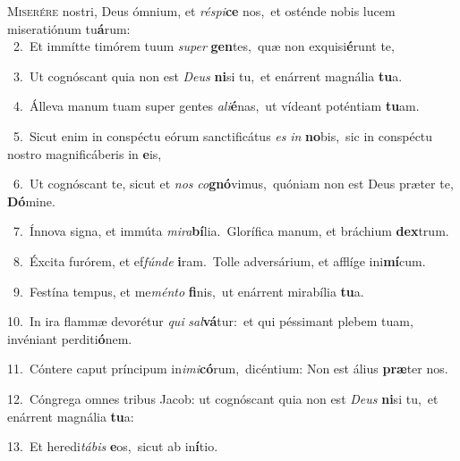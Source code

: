 \lettrine{\initial\textcolor{\initialcolor}{M}}{iserére} nostri, Deus ómnium, et \textit{ré}\-\textit{spi}\textbf{ce} nos,~\star et osténde nobis lucem miseratiónum tu\-\textbf{á}\-rum:\\
{\numbfont\textcolor{\numbcolor}{~2.}}~Et immítte timórem tuum \textit{su}\-\textit{per} \textbf{gen}\-tes,~\star quæ non exquisi\-\textbf{é}\-runt te,\par
{\numbfont\textcolor{\numbcolor}{~3.}}~Ut cognóscant quia non est \textit{De}\-\textit{us} \textbf{ni}\-si tu,~\star et enárrent magnália \textbf{tu}\-a.\par
{\numbfont\textcolor{\numbcolor}{~4.}}~Álleva manum tuam super gentes \textit{a}\-\textit{li}\textbf{é}nas,~\star ut vídeant poténtiam \textbf{tu}\-am.\par
{\numbfont\textcolor{\numbcolor}{~5.}}~Sicut enim in conspéctu eórum sanctificátus \textit{es} \textit{in} \textbf{no}\-bis,~\star sic in conspéctu nostro magnificáberis in \textbf{e}\-is,\par
{\numbfont\textcolor{\numbcolor}{~6.}}~Ut cognóscant te, sicut et \textit{nos} \textit{co}\-\textbf{gnó}vimus,~\star quóniam non est Deus præter te, \textbf{Dó}\-mine.\par
{\numbfont\textcolor{\numbcolor}{~7.}}~Ínnova signa, et immúta \textit{mi}\-\textit{ra}\textbf{bí}lia.~\star Glorífica manum, et bráchium \textbf{dex}\-trum.\par
{\numbfont\textcolor{\numbcolor}{~8.}}~Éxcita furórem, et ef\-\textit{fún}\-\textit{de} \textbf{i}\-ram.~\star Tolle adversárium, et afflíge ini\-\textbf{mí}\-cum.\par
{\numbfont\textcolor{\numbcolor}{~9.}}~Festína tempus, et me\-\textit{mén}\-\textit{to} \textbf{fi}\-nis,~\star ut enárrent mirabília \textbf{tu}\-a.\par
{\numbfont\textcolor{\numbcolor}{10.}}~In ira flammæ devorétur \textit{qui} \textit{sal}\-\textbf{vá}tur:~\star et qui péssimant plebem tuam, invéniant perditi\-\textbf{ó}\-nem.\par
{\numbfont\textcolor{\numbcolor}{11.}}~Cóntere caput príncipum in\-\textit{i}\-\textit{mi}\textbf{có}rum,~\star dicéntium: Non est álius \textbf{præ}\-ter nos.\par
{\numbfont\textcolor{\numbcolor}{12.}}~Cóngrega omnes tribus Jacob: ut cognóscant quia non est \textit{De}\-\textit{us} \textbf{ni}\-si tu,~\star et enárrent magnália \textbf{tu}\-a:\par
{\numbfont\textcolor{\numbcolor}{13.}}~Et heredi\-\textit{tá}\-\textit{bis} \textbf{e}\-os,~\star sicut ab in\-\textbf{í}\-tio.\par
